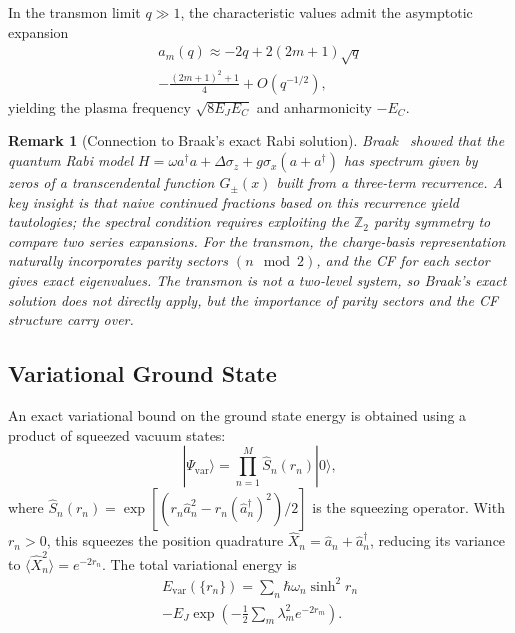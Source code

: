 \documentclass[reprint, floatfix, superscriptaddress, amsmath, amssymb, longbibliography]{revtex4-2}
\newtheorem{remark}[theorem]{Remark}
\begin{document}
In the transmon limit $q \gg 1$, the characteristic values admit the asymptotic expansion
\begin{multline}
a_m(q) \approx -2q + 2(2m+1)\sqrt{q} \\
- \frac{(2m+1)^2 + 1}{4} + O(q^{-1/2}),
\label{eq:mathieu_asymptotic}
\end{multline}
yielding the plasma frequency $\sqrt{8E_J E_C}$ and anharmonicity $-E_C$.

\begin{remark}[Connection to Braak's exact Rabi solution]
Braak~\cite{Braak2011} showed that the quantum Rabi model $H = \omega a^\dagger a + \Delta\sigma_z + g\sigma_x(a+a^\dagger)$ has spectrum given by zeros of a transcendental function $G_\pm(x)$ built from a three-term recurrence. A key insight is that naive continued fractions based on this recurrence yield tautologies; the spectral condition requires exploiting the $\mathbb{Z}_2$ parity symmetry to compare two series expansions. For the transmon, the charge-basis representation naturally incorporates parity sectors $(n \mod 2)$, and the CF for each sector gives exact eigenvalues. The transmon is not a two-level system, so Braak's exact solution does not directly apply, but the importance of parity sectors and the CF structure carry over.
\end{remark}


\subsection{Variational Ground State}
\label{sec:variational}

An exact variational bound on the ground state energy is obtained using a product of squeezed vacuum states:
\begin{equation}
|\Psi_{\mathrm{var}}\rangle = \prod_{n=1}^{M} \hat{S}_n(r_n) |0\rangle,
\label{eq:variational_ansatz}
\end{equation}
where $\hat{S}_n(r_n) = \exp[(r_n \hat{a}_n^2 - r_n (\hat{a}_n^\dagger)^2)/2]$ is the squeezing operator. With $r_n > 0$, this squeezes the position quadrature $\hat{X}_n = \hat{a}_n + \hat{a}_n^\dagger$, reducing its variance to $\langle \hat{X}_n^2 \rangle = e^{-2r_n}$. The total variational energy is
\begin{multline}
E_{\mathrm{var}}(\{r_n\}) = \sum_n \hbar\omega_n \sinh^2 r_n \\
- E_J \exp\left(-\frac{1}{2}\sum_m \lambda_m^2 e^{-2r_m}\right).
\label{eq:E_var_total}
\end{multline}
\end{document}
